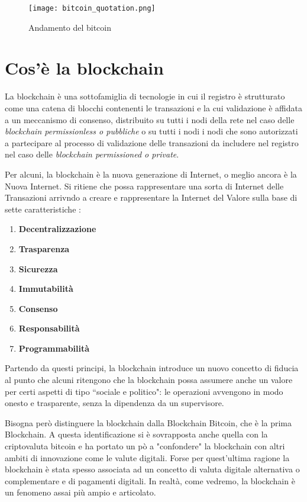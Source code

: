 \begin{figure}[htbp]
  \centering
  \texttt{[image: bitcoin\_quotation.png]}
  \caption{Andamento del bitcoin}
  \label{fig:bitcoin_quotation}
\end{figure}

\section{Cos'è la blockchain}
La blockchain è una sottofamiglia di tecnologie in cui il registro è strutturato come una catena di blocchi contenenti le transazioni e la cui validazione è affidata a un meccanismo di consenso, distribuito su tutti i nodi della rete nel caso delle \textit{blockchain permissionless o pubbliche} o su tutti i nodi i nodi che sono autorizzati a partecipare al processo di validazione delle transazioni da includere nel registro nel caso delle \textit{blockchain permissioned o private}.

Per alcuni, la blockchain è la nuova generazione di Internet, o meglio ancora è la Nuova Internet. Si ritiene che possa rappresentare una sorta di Internet delle Transazioni arrivndo a creare e rappresentare la Internet del Valore sulla base di sette caratteristiche \cite{bellini_2021}:

\begin{enumerate}
  \item \textbf{Decentralizzazione}
  \item \textbf{Trasparenza}
  \item \textbf{Sicurezza}
  \item \textbf{Immutabilità}
  \item \textbf{Consenso}
  \item \textbf{Responsabilità}
  \item \textbf{Programmabilità}
\end{enumerate}

Partendo da questi principi, la blockchain introduce un nuovo concetto di fiducia al punto che alcuni ritengono che la blockchain possa assumere anche un valore per certi aspetti di tipo “sociale e politico": le operazioni avvengono in modo onesto e trasparente, senza la dipendenza da un supervisore.

Bisogna però distinguere la blockchain dalla Blockchain Bitcoin, che è la prima Blockchain. A questa identificazione si è sovrapposta anche quella con la criptovaluta bitcoin e ha portato un pò a "confondere" la blockchain con altri ambiti di innovazione come le valute digitali. Forse per quest'ultima ragione la blockchain è stata spesso associata ad un concetto di valuta digitale alternativa o complementare e di pagamenti digitali. In realtà, come vedremo, la blockchain è un fenomeno assai più ampio e articolato.

